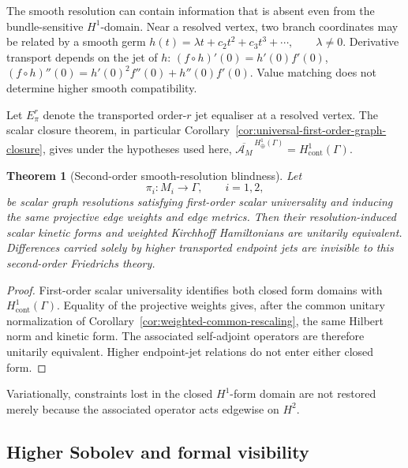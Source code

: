\documentclass[11pt]{article}
\theoremstyle{plain}
\newtheorem{theorem}{Theorem}[section]
\theoremstyle{definition}
\begin{document}
The smooth resolution can contain information that is absent even from the
bundle-sensitive \(H^1\)-domain. Near a resolved vertex, two branch
coordinates may be related by a smooth germ
\(h(t) = \lambda t+c_2t^2+c_3t^3+\cdots, \qquad \lambda\neq0\).
Derivative transport depends on the jet of \(h\):
\((f\circ h)'(0)=h'(0)f'(0)\),
\((f\circ h)''(0) = h'(0)^2f''(0)+h''(0)f'(0)\).
Value matching does not determine higher smooth compatibility.

Let \(E_\pi^r\) denote the transported order-\(r\) jet equaliser at a resolved vertex.
The scalar closure theorem, in particular
Corollary~\ref{cor:universal-first-order-graph-closure}, gives under the
hypotheses used here,
\(\overline{\mathscr A_M}^{\,H^1_\oplus(\Gamma)} = H^1_{\mathrm{cont}}(\Gamma)\).

\begin{theorem}[Second-order smooth-resolution blindness]
\label{thm:second-order-smooth-blindness}
Let
\[
  \pi_i:M_i\longrightarrow\Gamma,
  \qquad
  i=1,2,
\]
be scalar graph resolutions satisfying first-order scalar universality and
inducing the same projective edge weights and edge metrics. Then their
resolution-induced scalar kinetic forms and weighted Kirchhoff Hamiltonians are
unitarily equivalent. Differences carried solely by higher transported
endpoint jets are invisible to this second-order Friedrichs theory.
\end{theorem}

\begin{proof}
First-order scalar universality identifies both closed form domains with
\(H^1_{\mathrm{cont}}(\Gamma)\). Equality of the projective weights gives,
after the common unitary normalization of
Corollary~\ref{cor:weighted-common-rescaling}, the same Hilbert norm and
kinetic form. The associated self-adjoint operators are therefore unitarily
equivalent. Higher endpoint-jet relations do not enter either closed form.
\end{proof}

Variationally, constraints lost in the closed \(H^1\)-form domain are not restored merely because the associated operator acts edgewise on \(H^2\).

\subsection{Higher Sobolev and formal visibility}
\label{subsec:sobolev-jet-visibility}
\label{subsec:tangent-identity-return}
\label{subsec:formal-prolongation}
\label{subsec:second-order-formal-blindness}
\end{document}
